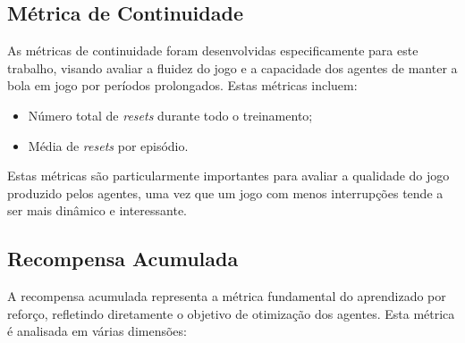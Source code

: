 \subsection{Métrica de Continuidade}

As métricas de continuidade foram desenvolvidas especificamente para este trabalho, visando avaliar a fluidez do jogo e a capacidade dos agentes de manter a bola em jogo por períodos prolongados. Estas métricas incluem:

\begin{itemize}
    \item Número total de \textit{resets} durante todo o treinamento;
    \item Média de \textit{resets} por episódio.
\end{itemize}

Estas métricas são particularmente importantes para avaliar a qualidade do jogo produzido pelos agentes, uma vez que um jogo com menos interrupções tende a ser mais dinâmico e interessante.





\subsection{Recompensa Acumulada}

A recompensa acumulada representa a métrica fundamental do aprendizado por reforço, refletindo diretamente o objetivo de otimização dos agentes. Esta métrica é analisada em várias dimensões:


